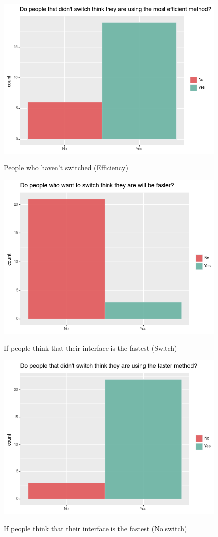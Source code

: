 \documentclass[]{report}
\begin{document}
		\begin{figure}[H]
			\centering
			\includegraphics[width=0.75\linewidth]{EfficientNoSwitch}\\
			\caption{People who haven't switched (Efficiency)}
			\label{fig: 10}
		\end{figure}
		
		\begin{figure}[H]
			\centering
			\includegraphics[width=0.75\linewidth]{SpeedSwitch}\\
			\caption{If people think that their interface is the fastest (Switch)}
			\label{fig:11}
		\end{figure}
		
		\begin{figure}[H]
			\centering
			\includegraphics[width=0.75\linewidth]{SpeedNoSwitch}\\
			\caption{If people think that their interface is the fastest (No switch)}
			\label{fig: 12}
		\end{figure}
		
\end{document}
